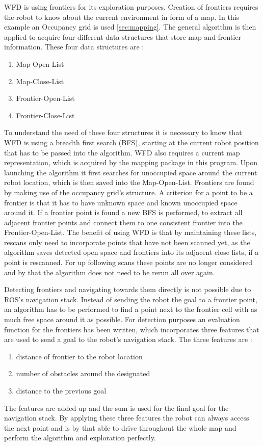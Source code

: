 \documentclass{ba-kecs}
\begin{document}
WFD is using frontiers for its exploration purposes. Creation of frontiers requires the robot to know about the current environment in form of a map. In this example an Occupancy grid is used \ref{sec:mapping}. The general algorithm is then applied to acquire four different data structures that store map and frontier information. These four data structures are :
\begin{enumerate}
\item{Map-Open-List}
\item{Map-Close-List}
\item{Frontier-Open-List}
\item{Frontier-Close-List}
\end{enumerate}
To understand the need of these four structures it is necessary to know that WFD is using a breadth first search (BFS), starting at the current robot position that has to be passed into the algorithm. WFD also requires a current map representation, which is acquired by the mapping package in this program.
Upon launching the algorithm it first searches for unoccupied space around the current robot location, which is then saved into the Map-Open-List. 
Frontiers are found by making use of the occupancy grid's structure. A criterion for a point to be a frontier is that it has to have unknown space and known unoccupied space around it. If a frontier point is found a new BFS is performed, to extract all adjacent frontier points and connect them to one consistent frontier into the Frontier-Open-List. The benefit of using WFD is that by maintaining these lists, rescans only need to incorporate points that have not been scanned yet, as the algorithm saves detected open space and frontiers into its adjacent close lists, if a point is rescanned. For up following scans these points are no longer considered and by that the algorithm does not need to be rerun all over again.
 
 Detecting frontiers and navigating towards them directly is not possible due to ROS's navigation stack. Instead of sending the robot the goal to a frontier point, an algorithm has to be performed to find a point next to the frontier cell with as much free space around it as possible. For detection purposes an evaluation function for the frontiers has been written, which incorporates three features that are used to send a goal to the robot's navigation stack. The three features are :
\begin{enumerate}
\item{distance of frontier to the robot location}
\item{number of obstacles around the designated} \item{distance to the previous goal}
\end{enumerate}
  The features are added up and the sum is used for the final goal for the navigation stack. By applying these three features the robot can always access the next point and is by that able to drive throughout the whole map and perform the algorithm and exploration perfectly.
\end{document}
